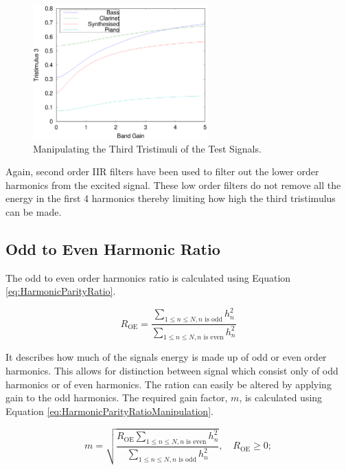 			\begin{figure}[h!]
				\centering
				\includegraphics[width=0.6\textwidth]{chapter6/Images/MoveTristimulus3.eps}
				\caption{Manipulating the Third Tristimuli of the Test Signals.}
				\label{fig:MoveTristimulus3}
			\end{figure}

			Again, second order IIR filters have been used to filter out the lower order harmonics from the
			excited signal.	These low order filters do not remove all the energy in the first 4 harmonics
			thereby limiting how high the third tristimulus can be made.

	\subsection{Odd to Even Harmonic Ratio}
	\label{sec:FeatureControl-Parameterisation-HarmonicParityRatio}
		The odd to even order harmonics ratio is calculated using Equation \ref{eq:HarmonicParityRatio}.
		
		\begin{equation}
			R_{\textrm{OE}} = \frac{\sum_{1 \leq n \leq N, n \textrm{ is odd}} h_{n}^{2}}
			              {\sum_{1 \leq n \leq N, n \textrm{ is even}} h_{n}^{2}}
			\label{eq:HarmonicParityRatio}
		\end{equation}

		It describes how much of the signals energy is made up of odd or even order harmonics. This allows for
		distinction between signal which consist only of odd harmonics or of even harmonics. The ration can easily
		be altered by applying gain to the odd harmonics. The required gain factor, $m$, is calculated using
		Equation \ref{eq:HarmonicParityRatioManipulation}.

		\begin{equation}
			m = \sqrt{\frac{R_{\textrm{OE}}\sum_{1 \leq n \leq N, n \textrm{ is even}} h_{n}^{2}}
			               {\sum_{1 \leq n \leq N, n \textrm{ is odd}} h_{n}^{2}}},
				       \quad R_{\textrm{OE}} \geq 0;
		       \label{eq:HarmonicParityRatioManipulation}
		\end{equation}

